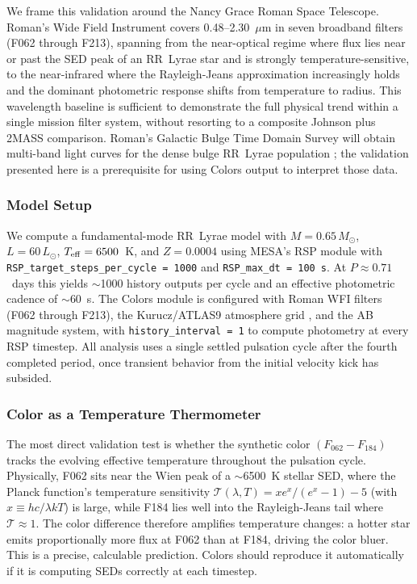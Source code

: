 \documentclass[linenumbers,apj,twocolumn, floatfix]{aastex701} \usepackage{amsmath} \usepackage{longtable} \usepackage{graphicx} \usepackage{ulem} \usepackage{xcolor} \usepackage{lettrine} \usepackage{yfonts} \usepackage{rotating}
\begin{document}
We frame this validation around the Nancy Grace Roman Space Telescope.
Roman's Wide Field Instrument covers 0.48--2.30~$\mu$m in seven broadband filters (F062 through F213), spanning from the near-optical regime where flux lies near or past the SED peak of an RR~Lyrae star and is strongly temperature-sensitive, to the near-infrared where the Rayleigh-Jeans approximation increasingly holds and the dominant photometric response shifts from temperature to radius.
This wavelength baseline is sufficient to demonstrate the full physical trend within a single mission filter system, without resorting to a composite Johnson plus 2MASS comparison.
Roman's Galactic Bulge Time Domain Survey will obtain multi-band light curves for the dense bulge RR~Lyrae population \citep{roman}; the validation presented here is a prerequisite for using Colors output to interpret those data.

\subsubsection{Model Setup}
\label{sec:rsp_setup}

We compute a fundamental-mode RR~Lyrae model with $M = 0.65\,M_\odot$, $L = 60\,L_\odot$, $T_{\rm eff} = 6500$~K, and $Z = 0.0004$ using MESA's RSP module \citep{MESAV} with \texttt{RSP\_target\_steps\_per\_cycle = 1000} and \texttt{RSP\_max\_dt = 100\,s}.
At $P \approx 0.71$~days this yields $\sim$1000 history outputs per cycle and an effective photometric cadence of $\sim$60~s.
The Colors module is configured with Roman WFI filters (F062 through F213), the Kurucz/ATLAS9 atmosphere grid \citep{Castelli04}, and the AB magnitude system, with \texttt{history\_interval = 1} to compute photometry at every RSP timestep.
All analysis uses a single settled pulsation cycle after the fourth completed period, once transient behavior from the initial velocity kick has subsided.

\subsubsection{Color as a Temperature Thermometer}
\label{sec:rsp_temp}

The most direct validation test is whether the synthetic color $(F_{062} - F_{184})$ tracks the evolving effective temperature throughout the pulsation cycle.
Physically, F062 sits near the Wien peak of a $\sim$6500~K stellar SED, where the Planck function's temperature sensitivity $\mathcal{T}(\lambda,T) = xe^x/(e^x-1) - 5$ (with $x \equiv hc/\lambda kT$) is large, while F184 lies well into the Rayleigh-Jeans tail where $\mathcal{T} \approx 1$.
The color difference therefore amplifies temperature changes: a hotter star emits proportionally more flux at F062 than at F184, driving the color bluer.
This is a precise, calculable prediction.
Colors should reproduce it automatically if it is computing SEDs correctly at each timestep.
\end{document}
